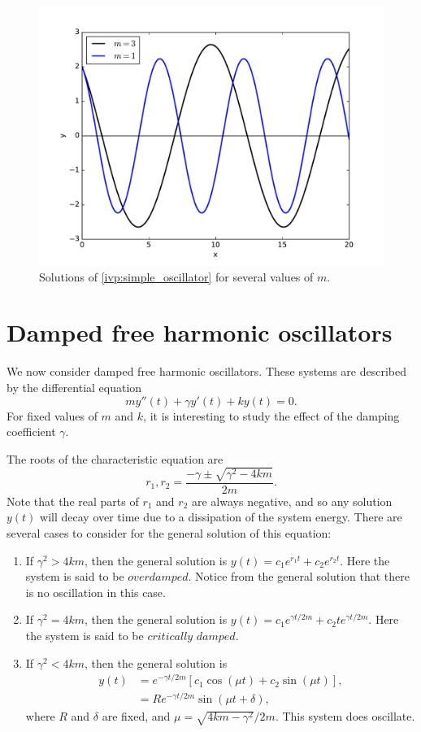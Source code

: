 \begin{figure}[ht]
\centering
\includegraphics[width=\textwidth]{simple_oscillator.pdf}
\caption{Solutions of \eqref{ivp:simple_oscillator} for several values of $m$.}
\label{ivp:simple_oscillator_figure}
\end{figure}


\section*{Damped free harmonic oscillators} 
We now consider damped free harmonic oscillators. 
These systems are described by the differential equation
\[my''(t) +\gamma y'(t) + ky(t) = 0.\]
For fixed values of $m$ and $k$, it is interesting to study the effect of the damping coefficient $\gamma$.

The roots of the characteristic equation are \[r_1,r_2 = \frac{-\gamma \pm \sqrt{\gamma^2 -4km}}{2m} .\]
Note that the real parts of $r_1$ and $r_2$ are always negative, and so any solution $y(t)$ will decay over time due to a dissipation of the system energy. 
There are several cases to consider for the general solution of this equation:
\begin{enumerate}
\item If $\gamma^2 > 4km$, then the general solution is $y(t) = c_1 e^{r_1t} + c_2e^{r_2t}$. Here the system is said to be $\textit{overdamped}$. 
Notice from the general solution that there is no oscillation in this case.
\item If $\gamma^2 = 4km$, then the general solution is $y(t) = c_1 e^{\gamma t/2m} + c_2 te^{\gamma t/2m}$. Here the system is said to be $\textit{critically damped}$.
\item If $\gamma^2 < 4km$, then the general solution is
\begin{align*}
y(t) &= e^{-\gamma t/2m} \left[c_1\cos(\mu t) + c_2 \sin (\mu t)\right],\\
&= R e^{-\gamma t/2m}  \sin (\mu t + \delta),
\end{align*}
where $R$ and $\delta$ are fixed, and $\mu = \sqrt{4km-\gamma^2}/2m.$ This system does oscillate.
\end{enumerate}

